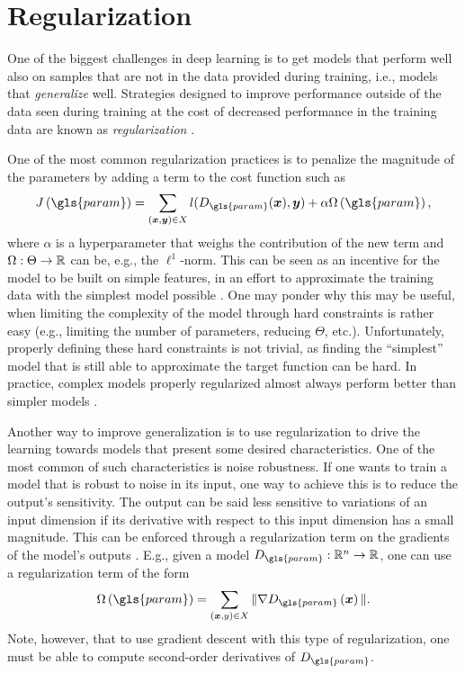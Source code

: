 \section{Regularization}\label{sec:regularization}

One of the biggest challenges in deep learning is to get models that perform well also on samples that are not in the data provided during training, i.e., models that \emph{generalize} well.
Strategies designed to improve performance outside of the data seen during training at the cost of decreased performance in the training data are known as \emph{regularization} \cite{goodfellow_deep_2016}.

One of the most common regularization practices is to penalize the magnitude of the parameters by adding a term to the cost function such as \[
J\left( \gls{param} \right) = \sum_{(\bm{x},\bm{y})\in X} l(D_{\gls{param}}(\bm{x}), \bm{y}) + \alpha\Omega\left( \gls{param} \right)
,\] where $\alpha$ is a hyperparameter that weighs the contribution of the new term and $\Omega:\Theta\to\mathbb{R}$ can be, e.g., the $\ell^1$-norm.
This can be seen as an incentive for the model to be built on simple features, in an effort to approximate the training data with the simplest model possible \cite{goodfellow_deep_2016}.
One may ponder why this may be useful, when limiting the complexity of the model through hard constraints is rather easy (e.g., limiting the number of parameters, reducing $\Theta$, etc.).
Unfortunately, properly defining these hard constraints is not trivial, as finding the ``simplest'' model that is still able to approximate the target function can be hard.
In practice, complex models properly regularized almost always perform better than simpler models \cite{goodfellow_deep_2016}.

Another way to improve generalization is to use regularization to drive the learning towards models that present some desired characteristics.
One of the most common of such characteristics is noise robustness.
If one wants to train a model that is robust to noise in its input, one way to achieve this is to reduce the output's sensitivity.
The output can be said less sensitive to variations of an input dimension if its derivative with respect to this input dimension has a small magnitude.
This can be enforced through a regularization term on the gradients of the model's outputs \cite{drucker_improving_1992}.
E.g., given a model $D_{\gls{param}}:\R^n\to\R$, one can use a regularization term of the form \[
    \Omega\left( \gls{param} \right) = \sum_{\left( \bm{x},y \right) \in X} \| \nabla D_{\gls{param}}\left( \bm{x} \right) \|
.\] Note, however, that to use gradient descent with this type of regularization, one must be able to compute second-order derivatives of $D_{\gls{param}}$.

